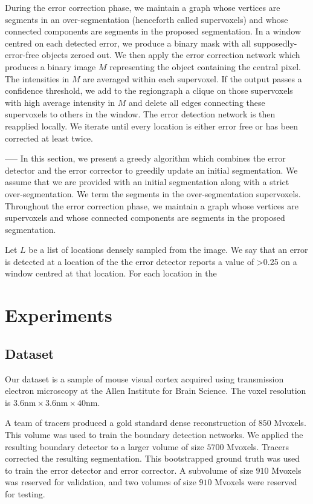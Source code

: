 \documentclass{article}
\begin{document}
During the error correction phase, we maintain a graph whose vertices are segments in an over-segmentation (henceforth called supervoxels) and whose connected components are segments in the proposed segmentation. In a window centred on each detected error, we produce a binary mask with all supposedly-error-free objects zeroed out. We then apply the error correction network which produces a binary image $M$ representing the object containing the central pixel. The intensities in $M$ are averaged within each supervoxel. If the output passes a confidence threshold, we add to the regiongraph a clique on those supervoxels with high average intensity in $M$ and delete all edges connecting these supervoxels to others in the window. The error detection network is then reapplied locally. We iterate until every location is either error free or has been corrected at least twice.


-----
In this section, we present a greedy algorithm which combines the error detector and the error corrector to greedily update an initial segmentation. We assume that we are provided with an initial segmentation along with a strict over-segmentation. We term the segments in the over-segmentation supervoxels. Throughout the error correction phase, we maintain a graph whose vertices are supervoxels and whose connected components are segments in the proposed segmentation.

Let $L$ be a list of locations densely sampled from the image. We say that an error is detected at a location of the the error detector reports a value of >0.25 on a window centred at that location. For each location in the 

\section{Experiments}
\subsection{Dataset}


Our dataset is a sample of mouse visual cortex acquired using transmission electron microscopy at the Allen Institute for Brain Science. The voxel resolution is $3.6\text{nm} \times 3.6\text{nm} \times 40\text{nm}$.

A team of tracers produced a gold standard dense reconstruction of $850$ Mvoxels. This volume was used to train the boundary detection networks. We applied the resulting boundary detector to a larger volume of size $5700$ Mvoxels.  Tracers corrected the resulting segmentation. This bootstrapped ground truth was used to train the error detector and error corrector. A subvolume of size $910$ Mvoxels was reserved for validation, and two volumes of size $910$ Mvoxels were reserved for testing.
\end{document}
